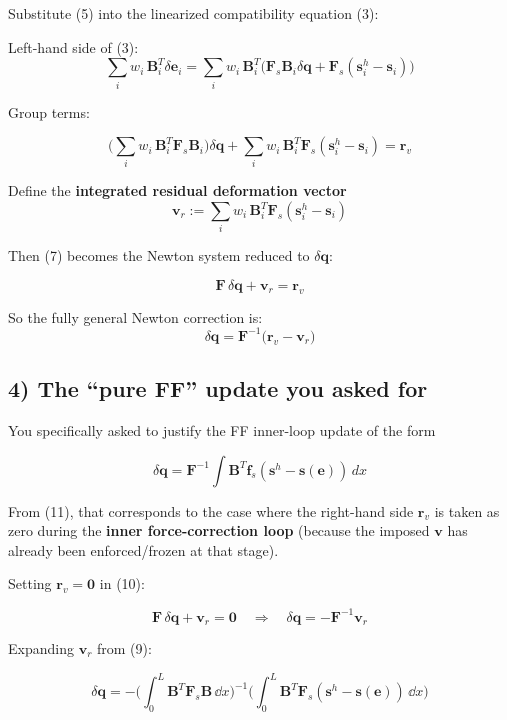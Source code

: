 Substitute (5) into the linearized compatibility equation (3):

Left-hand side of (3): \[
\sum_i w_i\,\mathbf{B}_i^{T}\delta\mathbf{e}_i
=
\sum_i w_i\,\mathbf{B}_i^{T}
\Big(
\mathbf{F}_{s}\mathbf{B}_i\delta\bm{q}
+
\mathbf{F}_{s}(\mathbf{s}^h_i-\mathbf{s}_i)
\Big)
\]

Group terms:

\[
\Big(\sum_i w_i\,\mathbf{B}_i^{T}\mathbf{F}_{s}\mathbf{B}_i\Big)\delta\bm{q}
+
\sum_i w_i\,\mathbf{B}_i^{T}\mathbf{F}_{s}(\mathbf{s}^h_i-\mathbf{s}_i)
=
\mathbf{r}_v
\tag{7}
\]


Define the \textbf{integrated residual deformation vector} \[
\boxed{
\bm{v}_r := \sum_i w_i\,\mathbf{B}_i^{T}\mathbf{F}_{s}(\mathbf{s}^h_i-\mathbf{s}_i)
}
\tag{9}
\]

Then (7) becomes the Newton system reduced to \(\delta\bm{q}\):

\[
\boxed{
\mathbf{F}\,\delta\bm{q} + \bm{v}_r = \mathbf{r}_v
}
\tag{10}
\]

So the fully general Newton correction is: \[
\boxed{
\delta\bm{q} = \mathbf{F}^{-1}\Big(\mathbf{r}_v - \bm{v}_r\Big)
}
\tag{11}
\]

\subsection{4) The ``pure FF'' update you asked
for}\label{the-pure-ff-update-you-asked-for}

You specifically asked to justify the FF inner-loop update of the form

\[
\delta\bm{q} = \mathbf{F}^{-1}\int \mathbf{B}^T\mathbf{f}_s(\mathbf{s}^h-\mathbf{s}(\mathbf{e}))\,dx
\]

From (11), that corresponds to the case where the right-hand side
\(\mathbf{r}_v\) is taken as zero during the \textbf{inner
force-correction loop} (because the imposed \(\bm{v}\) has already
been enforced/frozen at that stage).

Setting \(\mathbf{r}_v=\mathbf{0}\) in (10):

\[
\mathbf{F}\,\delta\bm{q} + \bm{v}_r = \mathbf{0}
\quad\Rightarrow\quad
\boxed{
\delta\bm{q} = -\mathbf{F}^{-1}\bm{v}_r
}
\tag{12}
\]

Expanding \(\bm{v}_r\) from (9):

\[
\boxed{
\delta\bm{q}
=
-\Big(\int_0^L \mathbf{B}^T\mathbf{F}_s\mathbf{B}\,\dd x\Big)^{-1}
\Big(\int_0^L \mathbf{B}^T\mathbf{F}_s(\mathbf{s}^h-\mathbf{s}(\mathbf{e}))\,\dd x\Big)
}
\tag{13}
\]

